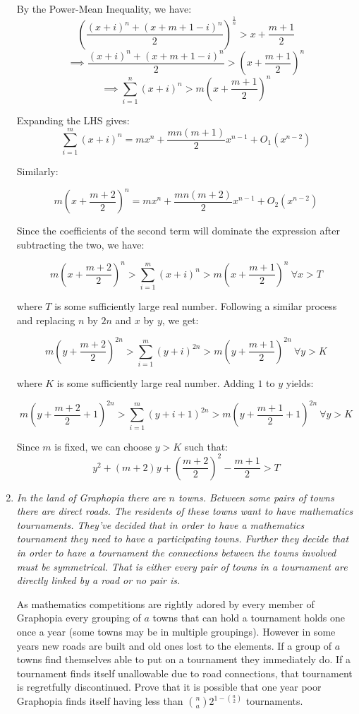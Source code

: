\documentclass{article}
\begin{document}
\begin{enumerate}
By the Power-Mean Inequality, we have:
$$(\frac{(x + i)^n + (x + m + 1 - i)^n}{2})^{\frac{1}{n}} > x + \frac{m + 1}{2}$$
$$\implies \frac{(x + i)^n + (x + m + 1 - i)^n}{2} > (x + \frac{m + 1}{2})^n$$
$$\implies \sum_{i = 1}^{n} (x + i)^n > m(x + \frac{m + 1}{2})^n$$

Expanding the LHS gives:
$$\sum_{i = 1}^{m} (x + i)^n = mx^n + \frac{mn(m + 1)}{2}x^{n - 1} + O_1(x^{n - 2})$$

Similarly:

$$m(x + \frac{m + 2}{2})^n = mx^n + \frac{mn(m + 2)}{2}x^{n - 1} + O_2(x^{n - 2})$$

Since the coefficients of the second term will dominate the expression after subtracting the two, we have:

$$m(x + \frac{m + 2}{2})^n > \sum_{i = 1}^{m} (x + i)^n > m(x + \frac{m + 1}{2})^n ~\forall x > T$$

where $T$ is some sufficiently large real number. Following a similar process and replacing $n$ by $2n$ and $x$ by $y$, we get:

$$m(y + \frac{m + 2}{2})^{2n} > \sum_{i = 1}^{m} (y + i)^{2n} > m(y + \frac{m + 1}{2})^{2n} ~\forall y > K$$

where $K$ is some sufficiently large real number. Adding $1$ to $y$ yields:

$$m(y + \frac{m + 2}{2} + 1)^{2n} > \sum_{i = 1}^{m} (y + i + 1)^{2n} > m(y + \frac{m + 1}{2} + 1)^{2n} ~\forall y > K$$

Since $m$ is fixed, we can choose $y > K$ such that: 
$$y^2 + (m + 2)y + (\frac{m + 2}{2})^2 - \frac{m + 1}{2} > T$$

\medskip
\item %
{\itshape In the land of Graphopia there are $n$ towns. Between some pairs of towns there are direct roads. The residents of these towns want to have mathematics tournaments. They've decided that in order to have a mathematics tournament they need to have $a$ participating towns. Further they decide that in order to have a tournament the connections between the towns involved must be symmetrical. That is either every pair of towns in a tournament are directly linked by a road or no pair is. 

As mathematics competitions are rightly adored by every member of Graphopia every grouping of $a$ towns that can hold a tournament holds one once a year (some towns may be in multiple groupings). However in some years new roads are built and old ones lost to the elements. If a group of $a$ towns find themselves able to put on a tournament they immediately do. If a tournament finds itself unallowable due to road connections, that tournament is regretfully discontinued. Prove that it is possible that one year poor Graphopia finds itself having less than $\binom{n}{a} $$2^{1-\binom{a}{2}}$ tournaments.
}



\end{enumerate}
\end{document}
